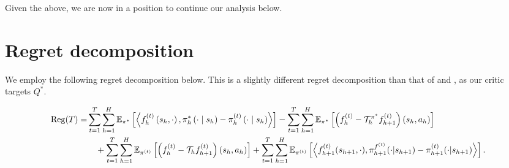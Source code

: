 Given the above, we are now in a position to continue our analysis below.


\section{Regret decomposition}
We employ the following regret decomposition below. This is a slightly different regret decomposition than that of \citet{cai2020provably} and \citet{zhong2023theoretical}, as our critic targets $Q^*$. 

\begin{lem}
\begin{align*}
    \operatorname{Reg}(T)%
    = & \sum_{t=1}^T \sum_{h=1}^H \mathbb{E}_{\pi^*}\left[\left\langle f_h^{(t)}\left(s_h, \cdot\right), \pi_h^*\left(\cdot \mid s_h\right)-\pi_h^{(t)}\left(\cdot \mid s_h\right)\right\rangle\right]-\sum_{t=1}^T \sum_{h=1}^H\mathbb{E}_{\pi^*}\left[\left(f_h^{(t)}-\gT_h^{\pi^{*}}f_{h+1}^{(t)}\right)\left(s_h, a_h\right)\right] \\
    &\quad+ \sum_{t=1}^T \sum_{h=1}^H\mathbb{E}_{\pi^{(t)}}\left[\left(f_h^{(t)}-\gT_h f_{h+1}^{(t)}\right)\left(s_h, a_h\right)\right]+ \sum_{t=1}^T \sum_{h=1}^H\mathbb{E}_{\pi^{(t)}}\left[\left\langle f_{h+1}^{(t)}(s_{h+1},\cdot), \pi_{h+1}^{f^{(t)}} (\cdot | s_{h+1}) -\pi_{h+1}^{(t)}(\cdot | s_{h+1}) \right\rangle\right].
\end{align*}
\label{lem:regret-decomp-ac}
\end{lem}
